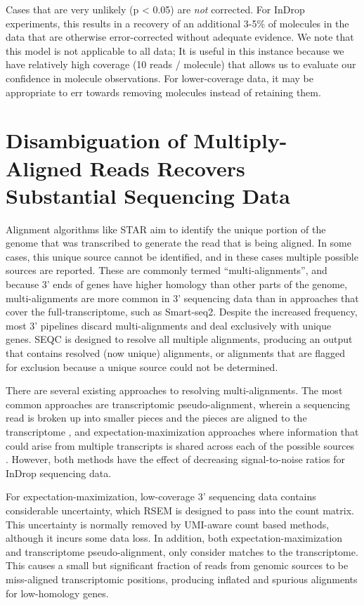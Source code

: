 Cases that are very unlikely (p \textless{} 0.05) are \emph{not} corrected. 
For InDrop experiments, this results in a recovery of an additional 3-5\% of molecules in the data that are otherwise error-corrected without adequate evidence. 
We note that this model is not applicable to all data; It is useful in this instance because we have relatively high coverage (10 reads / molecule) that allows us to evaluate our confidence in molecule observations. 
For lower-coverage data, it may be appropriate to err towards removing molecules instead of retaining them.

\section{Disambiguation of Multiply-Aligned Reads Recovers Substantial Sequencing Data}

Alignment algorithms like STAR aim to identify the unique portion of the genome that was transcribed to generate the read that is being aligned. 
In some cases, this unique source cannot be identified, and in these cases multiple possible sources are reported. 
These are commonly termed ``multi-alignments'', and because 3' ends of genes have higher homology than other parts of the genome, multi-alignments are more common in 3' sequencing data than in approaches that cover the full-transcriptome, such as Smart-seq2. 
Despite the increased frequency, most 3' pipelines discard multi-alignments and deal exclusively with unique genes. 
SEQC is designed to resolve all multiple alignments, producing an output that contains resolved (now unique) alignments, or alignments that are flagged for exclusion because a unique source could not be determined.

There are several existing approaches to resolving multi-alignments. 
The most common approaches are transcriptomic pseudo-alignment, wherein a sequencing read is broken up into smaller pieces and the pieces are aligned to the transcriptome \citep{Patro2017,Bray2016}, and expectation-maximization approaches where information that could arise from multiple transcripts is shared across each of the possible sources \citep{Li2011}.
However, both methods have the effect of decreasing signal-to-noise ratios for InDrop sequencing data. 

For expectation-maximization, low-coverage 3' sequencing data contains considerable uncertainty, which RSEM is designed to pass into the count matrix. 
This uncertainty is normally removed by UMI-aware count based methods, although it incurs some data loss. 
In addition, both expectation-maximization and transcriptome pseudo-alignment, only consider matches to the transcriptome. 
This causes a small but significant fraction of reads from genomic sources to be miss-aligned transcriptomic positions, producing inflated and spurious alignments for low-homology genes.

